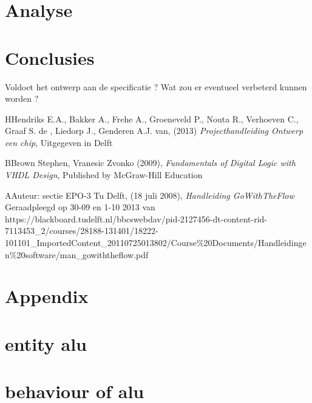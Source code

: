 \documentclass[11pt,twoside,a4paper]{article}
\begin{document}
\section{Analyse}


\section{Conclusies}

Voldoet het ontwerp aan de specificatie ?
Wat zou er eventueel verbeterd kunnen worden ?

\newpage
\begin{thebibliography}{7} %
%
\bibitem 
HHendriks E.A., Bakker A., Frehe A., Groeneveld P., Nouta R., Verhoeven C., Graaf S. de , Liedorp J., Genderen A.J. van,  (2013) \textit{Projecthandleiding Ontwerp een chip}, Uitgegeven in Delft

\bibitem 
BBrown Stephen, Vranesic Zvonko (2009), \textit{Fundamentals of Digital Logic with VHDL Design}, Published by McGraw-Hill Education


\bibitem AAuteur: sectie EPO-3 Tu Delft, (18 juli 2008), \textit{Handleiding GoWithTheFlow } Geraadpleegd op 30-09 en 1-10 2013 van https://blackboard.tudelft.nl/bbcswebdav/pid-2127456-dt-content-rid-7113453\_2/courses/28188-131401/18222-101101\_ImportedContent\_20110725013802/Course\%20Documents/Handleidingen\%20software/man\_gowiththeflow.pdf



\end{thebibliography}





\scriptsize
\newpage

\section{Appendix}

\appendix
\section{entity alu}
\label{entity}



\section{behaviour of alu}
\label{behaviour}

\end{document}
